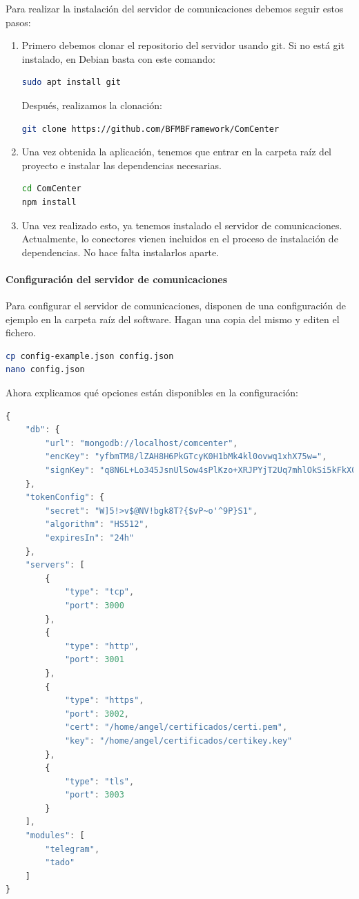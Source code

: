 \documentclass[spanish,12pt, a4paper, twoside]{paper}
\begin{document}
Para realizar la instalación del servidor de comunicaciones debemos seguir estos pasos:

\begin{enumerate}
\item Primero debemos clonar el repositorio del servidor usando git. Si no está git instalado, en Debian basta con este comando:
\begin{lstlisting}[language=sh]
sudo apt install git
\end{lstlisting}

Después, realizamos la clonación:
\begin{lstlisting}[language=sh]
git clone https://github.com/BFMBFramework/ComCenter
\end{lstlisting}

\item Una vez obtenida la aplicación, tenemos que entrar en la carpeta raíz del proyecto e instalar las dependencias necesarias.
\begin{lstlisting}[language=sh]
cd ComCenter
npm install
\end{lstlisting}

\item Una vez realizado esto, ya tenemos instalado el servidor de comunicaciones. Actualmente, lo conectores vienen incluidos en el proceso de instalación de dependencias. No hace falta instalarlos aparte.
\end{enumerate}

\paragraph{Configuración del servidor de comunicaciones}

Para configurar el servidor de comunicaciones, disponen de una configuración de ejemplo en la carpeta raíz del software. Hagan una copia del mismo y editen el fichero.

\begin{lstlisting}[language=sh]
cp config-example.json config.json
nano config.json
\end{lstlisting}

Ahora explicamos qué opciones están disponibles en la configuración:
\begin{lstlisting}[language=JavaScript]
{
	"db": {
		"url": "mongodb://localhost/comcenter",
		"encKey": "yfbmTM8/lZAH8H6PkGTcyK0H1bMk4kl0ovwq1xhX75w=",
		"signKey": "q8N6L+Lo345JsnUlSow4sPlKzo+XRJPYjT2Uq7mhlOkSi5kFkX0UoIY3etfm4UxtNHaM8xaX2HtkAhV7Gye0KA=="
	},
	"tokenConfig": {
		"secret": "W]5!>v$@NV!bgk8T?{$vP~o'^9P}S1",
		"algorithm": "HS512",
		"expiresIn": "24h"
	},
	"servers": [
		{
			"type": "tcp",
			"port": 3000
		},
		{
			"type": "http",
			"port": 3001
		},
		{
			"type": "https",
			"port": 3002,
			"cert": "/home/angel/certificados/certi.pem",
			"key": "/home/angel/certificados/certikey.key"
		},
		{
			"type": "tls",
			"port": 3003
		}
	],
	"modules": [
		"telegram",
		"tado"
	]
}
\end{lstlisting}
\end{document}
